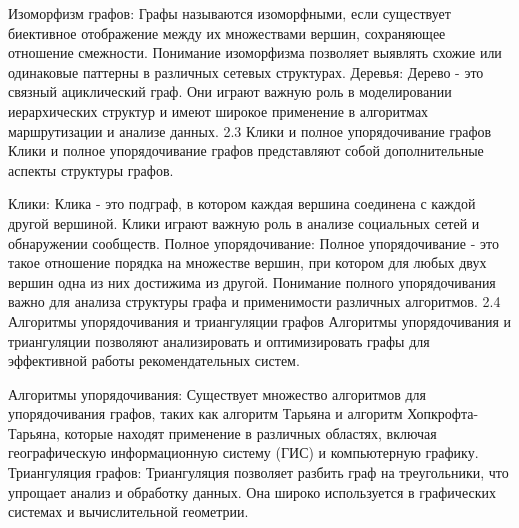 Изоморфизм графов: Графы называются изоморфными, если существует биективное отображение между их множествами вершин, сохраняющее отношение смежности. Понимание изоморфизма позволяет выявлять схожие или одинаковые паттерны в различных сетевых структурах.
Деревья: Дерево - это связный ациклический граф. Они играют важную роль в моделировании иерархических структур и имеют широкое применение в алгоритмах маршрутизации и анализе данных.
2.3 Клики и полное упорядочивание графов
Клики и полное упорядочивание графов представляют собой дополнительные аспекты структуры графов.

Клики: Клика - это подграф, в котором каждая вершина соединена с каждой другой вершиной. Клики играют важную роль в анализе социальных сетей и обнаружении сообществ.
Полное упорядочивание: Полное упорядочивание - это такое отношение порядка на множестве вершин, при котором для любых двух вершин одна из них достижима из другой. Понимание полного упорядочивания важно для анализа структуры графа и применимости различных алгоритмов.
2.4 Алгоритмы упорядочивания и триангуляции графов
Алгоритмы упорядочивания и триангуляции позволяют анализировать и оптимизировать графы для эффективной работы рекомендательных систем.

Алгоритмы упорядочивания: Существует множество алгоритмов для упорядочивания графов, таких как алгоритм Тарьяна и алгоритм Хопкрофта-Тарьяна, которые находят применение в различных областях, включая географическую информационную систему (ГИС) и компьютерную графику.
Триангуляция графов: Триангуляция позволяет разбить граф на треугольники, что упрощает анализ и обработку данных. Она широко используется в графических системах и вычислительной геометрии.